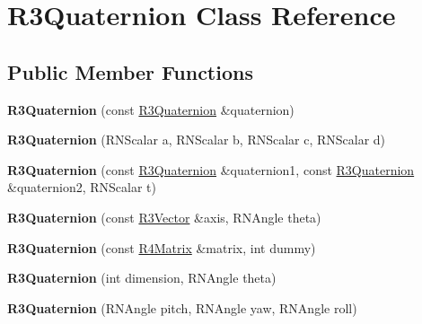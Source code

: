 \hypertarget{class_r3_quaternion}{}\section{R3\+Quaternion Class Reference}
\label{class_r3_quaternion}
\subsection*{Public Member Functions}
\begin{DoxyCompactItemize}
\item 
{\bfseries R3\+Quaternion} (const \hyperlink{class_r3_quaternion}{R3\+Quaternion} \&quaternion)\hypertarget{class_r3_quaternion_aec672473f45d7e942e17eba9fb591733}{}\label{class_r3_quaternion_aec672473f45d7e942e17eba9fb591733}

\item 
{\bfseries R3\+Quaternion} (R\+N\+Scalar a, R\+N\+Scalar b, R\+N\+Scalar c, R\+N\+Scalar d)\hypertarget{class_r3_quaternion_a27d3b526b8b6c4033290bb87ed2327ce}{}\label{class_r3_quaternion_a27d3b526b8b6c4033290bb87ed2327ce}

\item 
{\bfseries R3\+Quaternion} (const \hyperlink{class_r3_quaternion}{R3\+Quaternion} \&quaternion1, const \hyperlink{class_r3_quaternion}{R3\+Quaternion} \&quaternion2, R\+N\+Scalar t)\hypertarget{class_r3_quaternion_a83e4338050f07d4d53b150adaabfbb32}{}\label{class_r3_quaternion_a83e4338050f07d4d53b150adaabfbb32}

\item 
{\bfseries R3\+Quaternion} (const \hyperlink{class_r3_vector}{R3\+Vector} \&axis, R\+N\+Angle theta)\hypertarget{class_r3_quaternion_a9ac4421ac87be4a51db57f49965c29b2}{}\label{class_r3_quaternion_a9ac4421ac87be4a51db57f49965c29b2}

\item 
{\bfseries R3\+Quaternion} (const \hyperlink{class_r4_matrix}{R4\+Matrix} \&matrix, int dummy)\hypertarget{class_r3_quaternion_a5e46b1e3cdf52606cd45744824b733cc}{}\label{class_r3_quaternion_a5e46b1e3cdf52606cd45744824b733cc}

\item 
{\bfseries R3\+Quaternion} (int dimension, R\+N\+Angle theta)\hypertarget{class_r3_quaternion_a5fdf5fba967c70e89a78cd5be3e11526}{}\label{class_r3_quaternion_a5fdf5fba967c70e89a78cd5be3e11526}

\item 
{\bfseries R3\+Quaternion} (R\+N\+Angle pitch, R\+N\+Angle yaw, R\+N\+Angle roll)\hypertarget{class_r3_quaternion_a71cd579b88f35c245583dda32a8ecf1c}{}\label{class_r3_quaternion_a71cd579b88f35c245583dda32a8ecf1c}


\end{DoxyCompactItemize}
